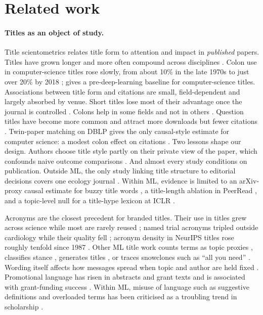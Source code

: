\section{Related work}
\label{sec:nt-related}

\paragraph{Titles as an object of study.}
Title scientometrics relates title form to attention and impact in \emph{published} papers. Titles have grown longer and more often compound across disciplines \citep{lewison2005whats,milojevic2017length,jiang2023titles}. Colon use in computer-science titles rose slowly, from about 10\% in the late 1970s to just over 20\% by 2018 \citep{nelson2018colons}; \citet{anthony2001characteristic} gives a pre-deep-learning baseline for computer-science titles. Associations between title form and citations are small, field-dependent and largely absorbed by venue. Short titles lose most of their advantage once the journal is controlled \citep{letchford2015advantage}. Colons help in some fields and not in others \citep{buter2011nonalphanumeric,hudson2016analysis,hartley2007planning,donovan2025disciplinary}. Question titles have become more common \citep{ball2009scholarly} and attract more downloads but fewer citations \citep{jamali2011article}. Twin-paper matching on DBLP gives the only causal-style estimate for computer science: a modest colon effect on citations \citep{sato2022twin}. Two lessons shape our design. Authors choose title style partly on their private view of the paper, which confounds naive outcome comparisons \citep{heard2023funny}. And almost every study conditions on publication. Outside ML, the only study linking title structure to editorial decisions covers one ecology journal \citep{fox2015relationship}. Within ML, evidence is limited to an arXiv-proxy causal estimate for buzzy title words \citep{veitch2020adapting}, a title-length ablation in PeerRead \citep{kang2018peerread}, and a topic-level null for a title-hype lexicon at ICLR \citep{xu2026reviewer}.

Acronyms are the closest precedent for branded titles. Their use in titles grew across science while most are rarely reused \citep{barnett2020growth}; named trial acronyms tripled outside cardiology while their quality fell \citep{pottegard2014scientific}; acronym density in NeurIPS titles rose roughly tenfold since 1987 \citep{mandyam2026machine}. Other ML title work counts terms as topic proxies \citep{mohammad2019state,mohammad2020nlp}, classifies stance \citep{beese2023negative}, generates titles \citep{chen2023transformers}, or traces snowclones \citep{pullum2004snowclones} such as ``all you need'' \citep{alyakin2025allyouneed}. Wording itself affects how messages spread when topic and author are held fixed \citep{tan2014effect}. Promotional language has risen in abstracts and grant texts \citep{vinkers2015positive,millar2022trends} and is associated with grant-funding success \citep{peng2024promotional}. Within ML, misuse of language such as suggestive definitions and overloaded terms has been criticised as a troubling trend in scholarship \citep{lipton2018troubling}.

